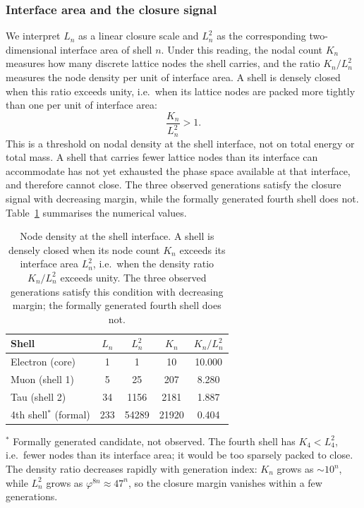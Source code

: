 \documentclass[10pt,a4paper]{article}
\begin{document}
\subsubsection*{Interface area and the closure signal}
We interpret $L_n$ as a linear closure scale and $L_n^2$ as the
corresponding two-dimensional interface area of shell $n$. Under this
reading, the nodal count $K_n$ measures how many discrete lattice nodes
the shell carries, and the ratio $K_n/L_n^2$ measures the node density
per unit of interface area. A shell is densely closed when this ratio
exceeds unity, i.e.\ when its lattice nodes are packed more tightly
than one per unit of interface area:
\begin{equation}
	\frac{K_n}{L_n^2} > 1 .
	\label{eq:closure_criterion}
\end{equation}
This is a threshold on nodal density at the shell interface, not on
total energy or total mass. A shell that carries fewer lattice nodes
than its interface can accommodate has not yet exhausted the phase
space available at that interface, and therefore cannot close. The
three observed generations satisfy the closure signal with decreasing
margin, while the formally generated fourth shell does not.
Table~\ref{tab:closure_criterion} summarises the numerical values.

\begin{table}[ht]
	\centering
	\caption{Node density at the shell interface. A shell is densely
		closed when its node count $K_n$ exceeds its interface area
		$L_n^2$, i.e.\ when the density ratio $K_n/L_n^2$ exceeds unity.
		The three observed generations satisfy this condition with
		decreasing margin; the formally generated fourth shell does not.}
	\label{tab:closure_criterion}
	\begin{tabular}{lcccc}
		\toprule
		\textbf{Shell} & $L_n$ & $L_n^2$ & $K_n$ & $K_n/L_n^2$ \\
		\midrule
		Electron (core)   & 1   & 1     & 10    & 10.000 \\
		Muon (shell 1)    & 5   & 25    & 207   & 8.280  \\
		Tau (shell 2)     & 34  & 1156  & 2181  & 1.887  \\
		\midrule
		4th shell$^\ast$ (formal) & 233 & 54289 & 21920 & 0.404 \\
		\bottomrule
	\end{tabular}
	
	\vspace{4pt}
	\raggedright\footnotesize
	$^\ast$ Formally generated candidate, not observed. The fourth
	shell has $K_4 < L_4^2$, i.e.\ fewer nodes than its interface area;
	it would be too sparsely packed to close. The density ratio decreases
	rapidly with generation index: $K_n$ grows as $\sim 10^n$, while
	$L_n^2$ grows as $\varphi^{8n} \approx 47^n$, so the closure margin
	vanishes within a few generations.
\end{table}
\end{document}
